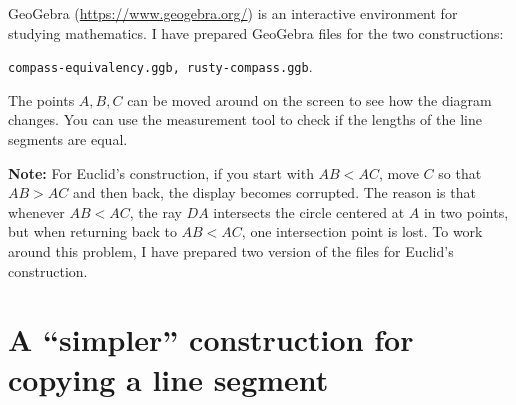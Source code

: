 GeoGebra (\url{https://www.geogebra.org/}) is an interactive environment for studying mathematics. I have prepared GeoGebra files for the two constructions: 
\begin{center}
\texttt{compass-equivalency.ggb, rusty-compass.ggb}.
\end{center}
The points $A,B,C$ can be moved around on the screen to see how the diagram changes. You can use the measurement tool to check if the lengths of the line segments are equal.

\textbf{Note:} For Euclid's construction, if you start with $AB<AC$, move $C$ so that $AB>AC$ and then back, the display becomes corrupted. The reason is that whenever $AB<AC$, the ray $DA$ intersects the circle centered at $A$ in two points, but when returning back to $AB<AC$, one intersection point is lost. To work around this problem, I have prepared two version of the files for Euclid's construction.


\section{A ``simpler'' construction for copying a line segment}

